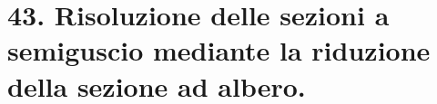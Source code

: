 \section{43. Risoluzione delle sezioni a semiguscio mediante la riduzione della sezione ad albero.}


